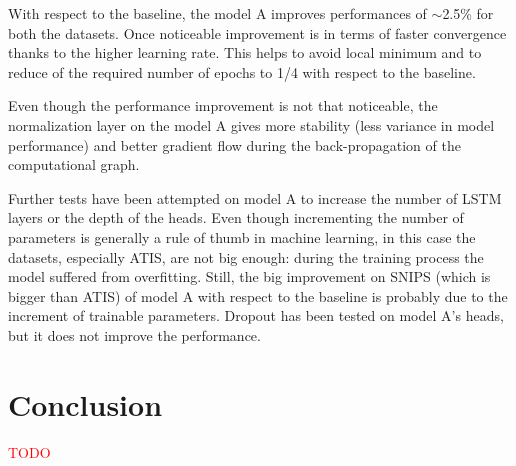 \documentclass[a4paper]{article}
\begin{document}
With respect to the baseline, the model A improves performances of $\sim$2.5\% for both the datasets. Once noticeable improvement is in terms of faster convergence thanks to the higher learning rate. This helps to avoid local minimum and to reduce of the required number of epochs to 1/4 with respect to the baseline.

Even though the performance improvement is not that noticeable, the normalization layer on the model A gives more stability (less variance in model performance) and better gradient flow during the back-propagation of the computational graph.

Further tests have been attempted on model A to increase the number of LSTM layers or the depth of the heads. Even though incrementing the number of parameters is generally a rule of thumb in machine learning, in this case the datasets, especially ATIS, are not big enough: during the training process the model suffered from overfitting. Still, the big improvement on SNIPS (which is bigger than ATIS) of model A with respect to the baseline is probably due to the increment of trainable parameters. Dropout has been tested on model A's heads, but it does not improve the performance.

\section{Conclusion}
\textcolor{red}{TODO}




\end{document}
